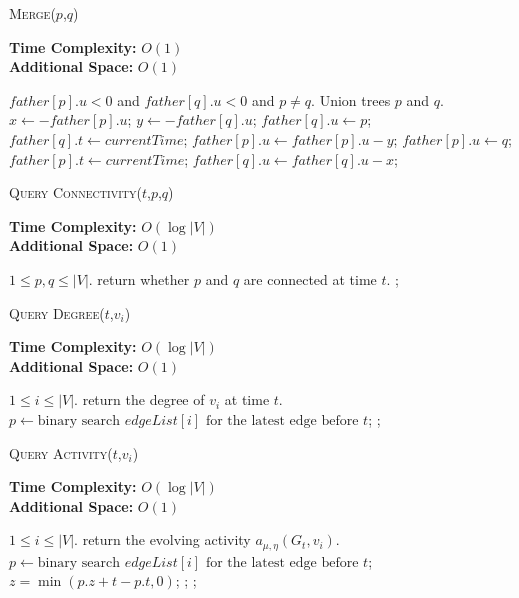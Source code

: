 \documentclass[12pt,abstract=true]{scrartcl}
\numberwithin{equation}{section}
\theoremstyle{definition}   \newtheorem{definition}{Definition}[section]
\theoremstyle{plain}        \newtheorem{theorem}{Theorem}[section]
\theoremstyle{plain}        \newtheorem{observation}{Observation}[section]
\theoremstyle{plain}        \newtheorem{fact}{Fact}[section]
\theoremstyle{plain}        \newtheorem{claim}{Claim}[section]
\theoremstyle{plain}        \newtheorem{lemma}[theorem]{Lemma}
\theoremstyle{plain}        \newtheorem{corollary}[theorem]{Corollary}
\theoremstyle{remark}       \newtheorem{example}{Example}[section]
\theoremstyle{remark}       \newtheorem{remark}{Remark}[section]
\begin{document}
\begin{algorithm}[htbp]
\caption{\textsc{Merge}($p$,$q$)}
\label{alg-merge}
\textbf{Time Complexity:} $O(1)$\\
\textbf{Additional Space:} $O(1)$
\begin{algorithmic}[1]
\Require $\mathit{father}[p].u<0$ and $\mathit{father}[q].u<0$
and $p\neq q$.
\Ensure Union trees $p$ and $q$.
\State $x \gets -\mathit{father}[p].u$;
\State $y \gets -\mathit{father}[q].u$;
	\State $\mathit{father}[q].u\gets p$;
	\State $\mathit{father}[q].t\gets \mathit{currentTime}$;
	\State $\mathit{father}[p].u \gets \mathit{father}[p].u-y$;
\Else
	\State $\mathit{father}[p].u\gets q$;
	\State $\mathit{father}[p].t\gets \mathit{currentTime}$;
	\State $\mathit{father}[q].u\gets \mathit{father}[q].u-x$;
\EndIf
\end{algorithmic}
\end{algorithm}

\begin{algorithm}[htbp]
\caption{\textsc{Query Connectivity}($t$,$p$,$q$)}
\label{alg-con}
\textbf{Time Complexity:} $O(\log |V|)$\\
\textbf{Additional Space:} $O(1)$
\begin{algorithmic}[1]
\Require $1\leq p,q \leq |V|$.
\Ensure return whether $p$ and $q$ are connected at time $t$.
\State {};
\end{algorithmic}
\end{algorithm}

\begin{algorithm}[htbp]
\caption{\textsc{Query Degree}($t$,$v_i$)}
\label{alg-deg}
\textbf{Time Complexity:} $O(\log |V|)$\\
\textbf{Additional Space:} $O(1)$
\begin{algorithmic}[1]
\Require $1\leq i\leq |V|$.
\Ensure return the degree of $v_i$ at time $t$.
\State $p\gets\text{binary search }\mathit{edgeList}[i]\text{ for
the latest edge before }t$;
\State{}
\Else
\State {};
\EndIf
\end{algorithmic}
\end{algorithm}


\begin{algorithm}[htbp]
\caption{\textsc{Query Activity}($t$,$v_i$)}
\label{alg-act}
\textbf{Time Complexity:} $O(\log |V|)$\\
\textbf{Additional Space:} $O(1)$
\begin{algorithmic}[1]
\Require $1\leq i\leq |V|$.
\Ensure return the evolving activity $a_{\mu,\eta}(G_t,v_i)$.
\State $p\gets\text{binary search }\mathit{edgeList}[i]\text{ for
the latest edge before }t$;
\State{}
\Else
\State $z=\min(p.z+t-p.t,0)$;
\State {};
\Else
\State {};
\EndIf
\EndIf
\end{algorithmic}
\end{algorithm}
\end{document}
